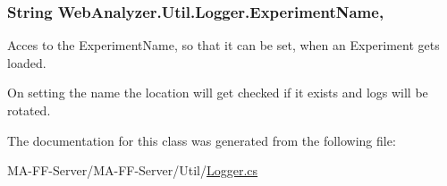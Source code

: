 \subsubsection[{Experiment\+Name}]{\setlength{\rightskip}{0pt plus 5cm}String Web\+Analyzer.\+Util.\+Logger.\+Experiment\+Name\hspace{0.3cm}{\ttfamily [get]}, {\ttfamily [set]}}\label{class_web_analyzer_1_1_util_1_1_logger_ae0228bcd61648d9b38e8aceaaf97024a}


Acces to the Experiment\+Name, so that it can be set, when an Experiment gets loaded. 

On setting the name the location will get checked if it exists and logs will be rotated. 

The documentation for this class was generated from the following file\+:\begin{DoxyCompactItemize}
\item 
M\+A-\/\+F\+F-\/\+Server/\+M\+A-\/\+F\+F-\/\+Server/\+Util/\hyperlink{_logger_8cs}{Logger.\+cs}\end{DoxyCompactItemize}
